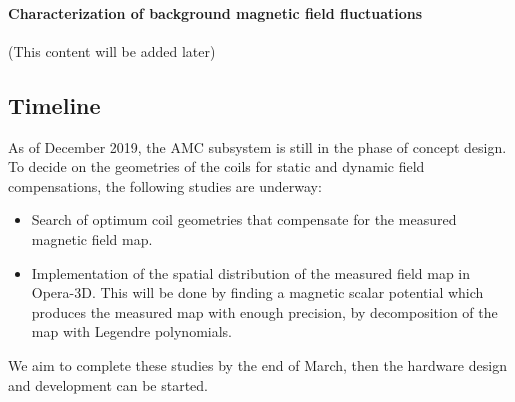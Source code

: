 
\paragraph*{Characterization of background magnetic field fluctuations}
(This content will be added later)



\subsection{Timeline}
As of December 2019, the AMC subsystem is still in the phase of concept design. To decide on the geometries of the coils for static and dynamic field compensations, the following studies are underway:
\begin{itemize}
\item Search of optimum coil geometries that compensate for the measured magnetic field map.
\item Implementation of the spatial distribution of the measured field map in Opera-3D. This will be done by finding a magnetic scalar potential which produces the measured map with enough precision, by decomposition of the map with Legendre polynomials. 
\end{itemize}
We aim to complete these studies by the end of March, then the hardware design and development can be started.




